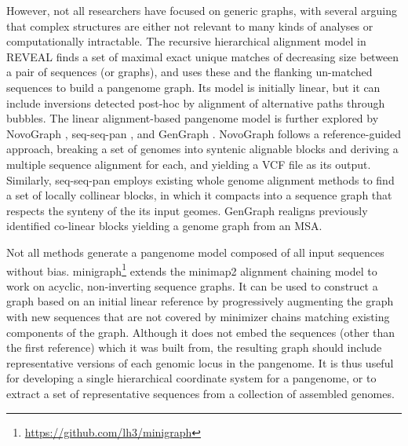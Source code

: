 However, not all researchers have focused on generic graphs, with several arguing that complex structures are either not relevant to many kinds of analyses or computationally intractable. %
The recursive hierarchical alignment model in REVEAL \cite{linthorst2015scalable} finds a set of maximal exact unique matches of decreasing size between a pair of sequences (or graphs), and uses these and the flanking un-matched sequences to build a pangenome graph.
Its model is initially linear, but it can include inversions detected post-hoc by alignment of alternative paths through bubbles.
The linear alignment-based pangenome model is further explored by NovoGraph \cite{Biederstedt2018}, seq-seq-pan \cite{Jandrasits_2018}, and GenGraph \cite{Ambler_2019}.
NovoGraph follows a reference-guided approach, breaking a set of genomes into syntenic alignable blocks and deriving a multiple sequence alignment for each, and yielding a VCF file as its output.
Similarly, seq-seq-pan employs existing whole genome alignment methods to find a set of locally collinear blocks, in which it compacts into a sequence graph that respects the synteny of the its input geomes.
GenGraph realigns previously identified co-linear blocks yielding a genome graph from an MSA.

Not all methods generate a pangenome model composed of all input sequences without bias.
minigraph\footnote{\url{https://github.com/lh3/minigraph}} extends the minimap2 \cite{Li_2018} alignment chaining model to work on acyclic, non-inverting sequence graphs.
It can be used to construct a graph based on an initial linear reference by progressively augmenting the graph with new sequences that are not covered by minimizer chains matching existing components of the graph.
Although it does not embed the sequences (other than the first reference) which it was built from, the resulting graph should include representative versions of each genomic locus in the pangenome.
It is thus useful for developing a single hierarchical coordinate system for a pangenome, or to extract a set of representative sequences from a collection of assembled genomes.

